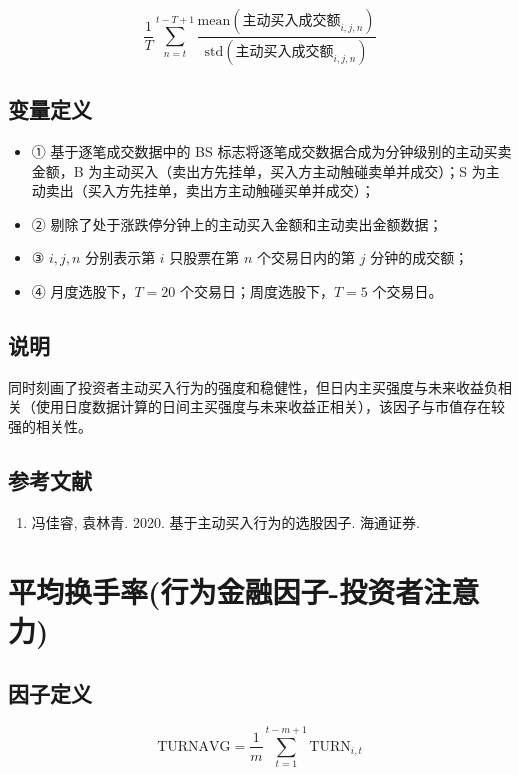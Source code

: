 \documentclass{article}
\begin{document}
\begin{equation}
    \frac{1}{T} \sum_{n=t}^{t-T+1} \frac{\mathrm{mean}(\text{主动买入成交额}_{i,j,n})}{\mathrm{std}(\text{主动买入成交额}_{i,j,n})}
\end{equation}

\subsection{变量定义}
\begin{itemize}
    \item ① 基于逐笔成交数据中的 BS 标志将逐笔成交数据合成为分钟级别的主动买卖金额，B 为主动买入（卖出方先挂单，买入方主动触碰卖单并成交）；S 为主动卖出（买入方先挂单，卖出方主动触碰买单并成交）；
    \item ② 剔除了处于涨跌停分钟上的主动买入金额和主动卖出金额数据；
    \item ③ \( i, j, n \) 分别表示第 \( i \) 只股票在第 \( n \) 个交易日内的第 \( j \) 分钟的成交额；
    \item ④ 月度选股下，\( T = 20 \) 个交易日；周度选股下，\( T = 5 \) 个交易日。
\end{itemize}

\subsection{说明}
同时刻画了投资者主动买入行为的强度和稳健性，但日内主买强度与未来收益负相关（使用日度数据计算的日间主买强度与未来收益正相关），该因子与市值存在较强的相关性。

\subsection{参考文献}
\begin{enumerate}
    \item 冯佳睿, 袁林青. 2020. 基于主动买入行为的选股因子. 海通证券.
\end{enumerate}

\section{平均换手率(行为金融因子-投资者注意力)}

\subsection{因子定义}
\begin{equation}
    \mathrm{TURNAVG} = \frac{1}{m} \sum_{t=1}^{t-m+1} \mathrm{TURN}_{i,t}
\end{equation}
\end{document}
